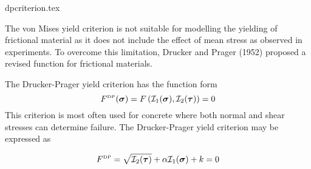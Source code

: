 \begin{flushright} {\tiny {\color{gray} dpcriterion.tex}} \end{flushright}

The von Mises yield criterion is not suitable for modelling the yielding of frictional material 
as it does not include the effect of mean stress as observed in experiments. To overcome this 
limitation, Drucker and Prager (1952) \cite{drpr52} proposed a revised function for frictional materials.

The Drucker-Prager yield criterion has the function form
\begin{equation}
F^{\text{\tiny DP}}({\bm \sigma})=F \left( {\cal I}_1({\bm \sigma}), {\cal I}_2({\bm \tau}) \right) = 0 
\end{equation}
This criterion is most often used for concrete where both normal and shear stresses 
can determine failure. The Drucker-Prager yield criterion may be expressed as
\begin{mdframed}[backgroundcolor=blue!5]
\begin{equation}
F^{\text{\tiny DP}}= \sqrt{{\cal I}_2({\bm \tau})} + \alpha {\cal I}_1({\bm \sigma}) + k =0  
\label{dpcriterion} 
\end{equation}
\end{mdframed}

